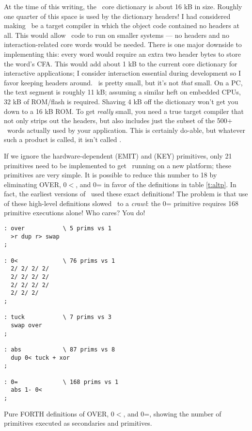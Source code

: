 \documentclass{article}
\begin{document}
At the time of this writing, the \M\ core dictionary is about 16 kB in
size. Roughly one quarter of this space is used by the dictionary
headers! I had considered making \M\ be a target compiler in which the
object code contained no headers at all. This would allow \M\ code to
run on smaller systems --- no headers and no interaction-related core
words would be needed. There is one major downside to implementing
this: every word would require an extra two header bytes to store the
word's CFA. This would add about 1 kB to the current core dictionary
for interactive applications; I consider interaction essential during
development so I favor keeping headers around. \M\ is pretty small,
but it's not \textit{that} small. On a PC, the  text
segment is roughly 11 kB; assuming a similar heft on embedded CPUs, 32
kB of ROM/flash is required. Shaving 4 kB off the dictionary won't get
you down to a 16 kB ROM. To get \textit{really} small, you need a true
target compiler that not only strips out the headers, but also
includes just the subset of the 500+ \M\ words actually used by your
application. This is certainly do-able, but whatever such a product is
called, it isn't called \M.

If we ignore the hardware-dependent (EMIT) and (KEY) primitives, only
21 primitives need to be implemented to get \M\ running on a new
platform; these primitives are very simple. It is possible to reduce
this number to 18 by eliminating OVER, 0$<$, and 0= in favor of the
definitions in table \ref{t:altp}. In fact, the earliest versions of
\M\ used these exact definitions! The problem is that use of these
high-level definitions slowed \M\ to a \textit{crawl}: the 0=
primitive requires 168 primitive executions alone! Who cares? You do!

\begin{table}
\begin{center}
\begin{verbatim}
: over           \ 5 prims vs 1
  >r dup r> swap
;

: 0<             \ 76 prims vs 1
  2/ 2/ 2/ 2/
  2/ 2/ 2/ 2/
  2/ 2/ 2/ 2/
  2/ 2/ 2/
;

: tuck           \ 7 prims vs 3
  swap over
;

: abs            \ 87 prims vs 8
  dup 0< tuck + xor
;

: 0=             \ 168 prims vs 1
  abs 1- 0<
;
\end{verbatim}
\end{center}
\caption{Pure FORTH definitions of OVER, 0$<$, and 0=, showing the
         number of primitives executed as secondaries and primitives.}
\label{t:altp}
\end{table}
\end{document}
